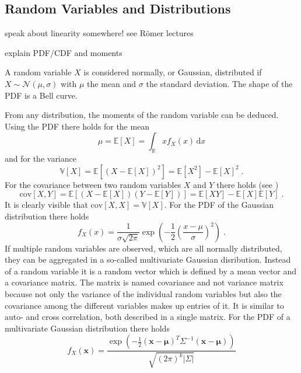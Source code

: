 \documentclass[%
  a4paper,oneside,%
  11pt,%
  smallchapters,
  style=printdev,
  extramargin,
  green,%
  rgb, <cmyk>
  ]{tubsbook}
\begin{document}
\subsection{Random Variables and Distributions}
\label{sec:MultiGauss}
speak about linearity somewhere! see Römer lectures

explain PDF/CDF and moments

A random variable $X$ is considered normally, or Gaussian, distributed if $X \sim \mathcal{N}(\mu, \sigma)$ with $\mu$ the mean and $\sigma$ the standard deviation. The shape of the PDF is a Bell curve.

From any distribution, the moments of the random variable can be deduced. Using the PDF there holds for the mean
\begin{equation}
\mu = \mathbb{E}[X] = \int_{\mathbb{R}} x f_X(x) \, \mathrm{d}x
\end{equation}
%
and for the variance
\begin{equation}
\mathbb{V}[X] = \mathbb{E}[(X-\mathbb{E}[X])^2] = \mathbb{E}[X^2] - \mathbb{E}[X]^2 \;.
\end{equation}
%
For the covariance between two random variables $X$ and $Y$ there holds (see \cite[p. 1434]{arens2015})
\begin{equation}
\mathrm{cov}[X,Y] = \mathbb{E}[(X-\mathbb{E}[X])(Y-\mathbb{E}[Y])] = \mathbb{E}[XY] - \mathbb{E}[X] \mathbb{E}[Y]\;.
\label{eqn:Covariance}
\end{equation}
It is clearly visible that $\mathrm{cov}[X,X] = \mathbb{V}[X]$.
%
For the PDF of the Gaussian distribution there holds
\begin{equation}
f_X(x) = \frac{1}{\sigma \sqrt{2 \pi}} \exp(-\frac{1}{2} \left(\frac{x-\mu}{\sigma}\right)^2) \;.
\end{equation}
%
If multiple random variables are observed, which are all normally distributed, they can be aggregated in a so-called multivariate Gaussian disribution. Instead of a random variable it is a random vector which is defined by a mean vector and a covariance matrix. The matrix is named covariance and not variance matrix because not only the variance of the individual random variables but also the covariance among the different variables makes up entries of it. It is similar to auto- and cross correlation, both described in a single matrix.
For the PDF of a multivariate Gaussian distribution there holds
\begin{equation}
f_X(\bm{x}) = \frac{\exp(-\frac{1}{2}(\bm{x}-\bm{\mu})^T \Sigma^{-1}(\bm{x}-\bm{\mu}))}{\sqrt{(2\pi)^k \lvert \Sigma \rvert}}
\label{eqn:MultivariateGaussian}
\end{equation}
\end{document}
